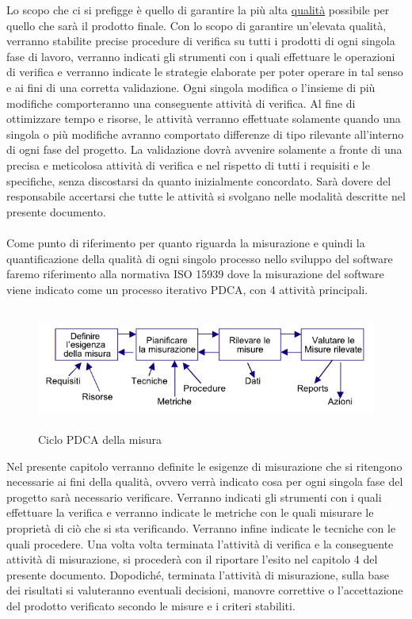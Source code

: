 Lo scopo che ci si prefigge \`e quello di garantire la pi\`u alta
\underline{qualit\`a} possibile per quello che sar\`a il prodotto finale. Con lo
scopo di garantire un'elevata qualit\`a, verranno stabilite precise procedure di
verifica su tutti i prodotti di ogni singola fase di lavoro, verranno indicati
gli strumenti con i quali effettuare le operazioni di verifica e verranno
indicate le strategie elaborate per poter operare in tal senso e ai fini di una
corretta validazione. Ogni singola modifica o l'insieme di pi\`u modifiche
comporteranno una conseguente attivit\`a di verifica. Al fine di
ottimizzare tempo e risorse, le attivit\`a verranno effettuate solamente quando
una singola o pi\`u modifiche avranno comportato differenze di tipo rilevante
all'interno di ogni fase del progetto. La validazione dovr\`a avvenire
solamente a fronte di una precisa e meticolosa attivit\`a di verifica e nel
rispetto di tutti i requisiti e le specifiche, senza discostarsi da
quanto inizialmente concordato. Sar\`a dovere del responsabile accertarsi che
tutte le attivit\`a si svolgano nelle modalit\`a descritte nel presente documento.
\\
\\ 
Come punto di riferimento per quanto riguarda la misurazione e quindi la
quantificazione della qualit\`a di ogni singolo processo nello sviluppo del
software faremo riferimento alla normativa ISO 15939 dove la misurazione del
software viene indicato come un processo iterativo PDCA, con 4 attivit\`a
principali.

\begin{figure}[h]
  \centering
  \includegraphics[height=4cm]{img/PQ/pdca.png}
\caption{Ciclo PDCA della misura}
\end{figure}

Nel presente capitolo verranno definite le esigenze di misurazione che si
ritengono necessarie ai fini della qualit\`a, ovvero verr\`a indicato cosa per ogni
singola fase del progetto sar\`a necessario verificare. Verranno indicati gli
strumenti con i quali effettuare la verifica e verranno indicate le metriche con
le quali misurare le propriet\`a di ci\`o che si sta verificando. Verranno
infine indicate le tecniche con le quali procedere. Una volta volta terminata
l'attivit\`a di verifica e la conseguente attivit\`a di misurazione, si proceder\`a con il
riportare l'esito nel capitolo 4 del presente documento. Dopodich\'e, terminata
l'attivit\`a di misurazione, sulla base dei risultati si valuteranno eventuali
decisioni, manovre correttive o l'accettazione del prodotto verificato secondo
le misure e i criteri stabiliti.


